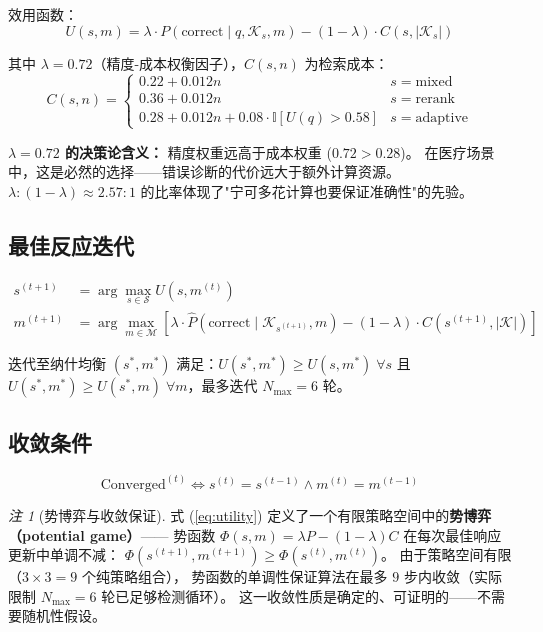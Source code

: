 \documentclass[11pt,a4paper]{ctexart}
\theoremstyle{remark}
\newtheorem{remark}{注}[section]
\begin{document}
效用函数：
\begin{equation}
U(s, m) = \lambda \cdot P(\text{correct} \mid q, \mathcal{K}_s, m) - (1 - \lambda) \cdot C(s, |\mathcal{K}_s|)
\label{eq:utility}
\end{equation}

其中 $\lambda = 0.72$（精度-成本权衡因子），$C(s, n)$ 为检索成本：
\begin{equation}
C(s, n) =
\begin{cases}
0.22 + 0.012n & s = \text{mixed} \\
0.36 + 0.012n & s = \text{rerank} \\
0.28 + 0.012n + 0.08 \cdot \mathbb{I}[U(q) > 0.58] & s = \text{adaptive}
\end{cases}
\end{equation}

\textbf{$\lambda = 0.72$ 的决策论含义：} 精度权重远高于成本权重 ($0.72 > 0.28$)。
在医疗场景中，这是必然的选择——错误诊断的代价远大于额外计算资源。
$\lambda: (1-\lambda) \approx 2.57:1$ 的比率体现了"宁可多花计算也要保证准确性"的先验。

\subsection{最佳反应迭代}

\begin{align}
s^{(t+1)} &= \arg\max_{s \in \mathcal{S}} U(s, m^{(t)}) \\
m^{(t+1)} &= \arg\max_{m \in \mathcal{M}} \left[\lambda \cdot \hat{P}(\text{correct} \mid \mathcal{K}_{s^{(t+1)}}, m) - (1-\lambda) \cdot C(s^{(t+1)}, |\mathcal{K}|)\right]
\end{align}

迭代至纳什均衡 $(s^*, m^*)$ 满足：$U(s^*, m^*) \geq U(s, m^*)\; \forall s$ 且 $U(s^*, m^*) \geq U(s^*, m)\; \forall m$，最多迭代 $N_{\max} = 6$ 轮。

\subsection{收敛条件}

\begin{equation}
\text{Converged}^{(t)} \iff s^{(t)} = s^{(t-1)} \land m^{(t)} = m^{(t-1)}
\end{equation}

\begin{remark}[势博弈与收敛保证]
式 (\ref{eq:utility}) 定义了一个有限策略空间中的\textbf{势博弈（potential game）}——
势函数 $\Phi(s,m) = \lambda P - (1-\lambda)C$ 在每次最佳响应更新中单调不减：
$\Phi(s^{(t+1)}, m^{(t+1)}) \geq \Phi(s^{(t)}, m^{(t)})$。
由于策略空间有限（$3 \times 3 = 9$ 个纯策略组合），
势函数的单调性保证算法在最多 $9$ 步内收敛（实际限制 $N_{\max}=6$ 轮已足够检测循环）。
这一收敛性质是确定的、可证明的——不需要随机性假设。
\end{remark}
\end{document}
